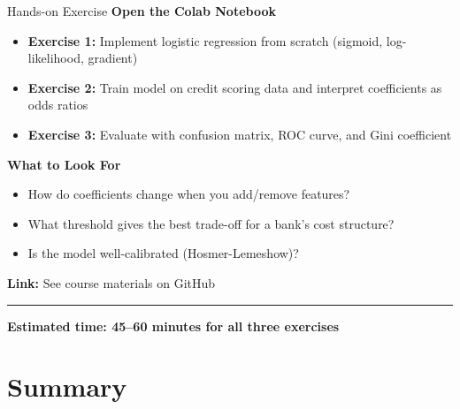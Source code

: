 \documentclass[8pt,aspectratio=169]{beamer}
\newcommand{\bottomnote}[1]{%
\vfill
\vspace{-2mm}
\textcolor{mllavender2}{\rule{\textwidth}{0.4pt}}
\vspace{1mm}
\footnotesize
\textbf{#1}
}
\begin{document}
\begin{frame}[t]{Hands-on Exercise}
\textbf{Open the Colab Notebook}

\begin{itemize}
  \item \textbf{Exercise 1:} Implement logistic regression from scratch (sigmoid, log-likelihood, gradient)
  \item \textbf{Exercise 2:} Train model on credit scoring data and interpret coefficients as odds ratios
  \item \textbf{Exercise 3:} Evaluate with confusion matrix, ROC curve, and Gini coefficient
\end{itemize}

\vspace{1em}
\textbf{What to Look For}
\begin{itemize}
  \item How do coefficients change when you add/remove features?
  \item What threshold gives the best trade-off for a bank's cost structure?
  \item Is the model well-calibrated (Hosmer-Lemeshow)?
\end{itemize}

\vspace{0.5em}
\textbf{Link:} See course materials on GitHub
\bottomnote{Estimated time: 45--60 minutes for all three exercises}
\end{frame}


\section{Summary}
\end{document}
